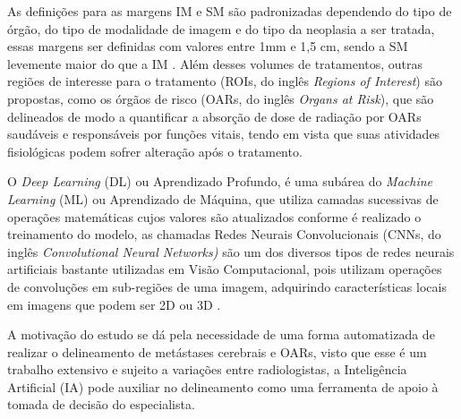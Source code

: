 As definições para as margens IM e SM são padronizadas dependendo do tipo de órgão, do tipo de modalidade de imagem e do tipo da neoplasia a ser tratada, essas margens ser definidas com valores entre 1mm e 1,5 cm, sendo a SM levemente maior do que a IM \cite{Lee:2013}. Além desses volumes de tratamentos, outras regiões de interesse para o tratamento (ROIs, do inglês \textit{Regions of Interest}) são propostas, como os órgãos de risco (OARs, do inglês \textit{Organs at Risk}), que são delineados de modo a quantificar a absorção de dose de radiação por OARs saudáveis e responsáveis por funções vitais, tendo em vista que suas atividades fisiológicas podem sofrer alteração após o tratamento.

O \textit{Deep Learning} (DL) ou Aprendizado Profundo, é uma subárea do \textit{Machine Learning} (ML) ou Aprendizado de Máquina, que utiliza camadas sucessivas de operações matemáticas cujos valores são atualizados conforme é realizado o treinamento do modelo, as chamadas Redes Neurais Convolucionais (CNNs, do inglês \textit{Convolutional Neural Networks)} são um dos diversos tipos de redes neurais artificiais bastante utilizadas em Visão Computacional, pois utilizam operações de convoluções em sub-regiões de uma imagem, adquirindo características locais em imagens que podem ser 2D ou 3D \cite{Chollet:2017}.

A motivação do estudo se dá pela necessidade de uma forma automatizada de realizar o delineamento de metástases cerebrais e OARs, visto que esse é um trabalho extensivo e sujeito a variações entre radiologistas, a Inteligência Artificial (IA) pode auxiliar no delineamento como uma ferramenta de apoio à tomada de decisão do especialista. 

